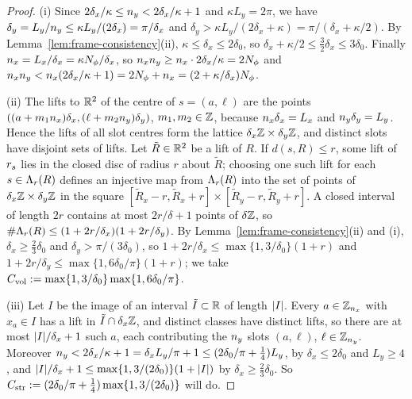\begin{proof}
(i) Since $2\delta_x/\kappa\le n_y<2\delta_x/\kappa+1$ and $\kappa L_y=2\pi$, we have
$\delta_y=L_y/n_y\le\kappa L_y/(2\delta_x)=\pi/\delta_x$ and $\delta_y>\kappa L_y/(2\delta_x+\kappa)=\pi/(\delta_x+\kappa/2)$.
By Lemma~\ref{lem:frame-consistency}(ii), $\kappa\le\delta_x\le2\delta_0$, so $\delta_x+\kappa/2\le\frac32\delta_x\le3\delta_0$.
Finally $n_x=L_x/\delta_x=\kappa N_{\phi}/\delta_x$, so $n_xn_y\ge n_x\cdot2\delta_x/\kappa=2N_{\phi}$ and
$n_xn_y<n_x(2\delta_x/\kappa+1)=2N_{\phi}+n_x=(2+\kappa/\delta_x)N_{\phi}$.

(ii) The lifts to $\mathbb{R}^2$ of the centre of $s=(a,\ell)$ are the points $((a+m_1n_x)\delta_x,(\ell+m_2n_y)\delta_y)$,
$m_1,m_2\in\mathbb{Z}$, because $n_x\delta_x=L_x$ and $n_y\delta_y=L_y$. Hence the lifts of all slot centres form the
lattice $\delta_x\mathbb{Z}\times\delta_y\mathbb{Z}$, and distinct slots have disjoint sets of lifts. Let $\tilde R\in\mathbb{R}^2$ be a lift
of $R$. If $d(s,R)\le r$, some lift of $r_{s}$ lies in the closed disc of radius $r$ about $\tilde R$; choosing one
such lift for each $s\in\Lambda_{r}(R)$ defines an injective map from $\Lambda_{r}(R)$ into the set of points of
$\delta_x\mathbb{Z}\times\delta_y\mathbb{Z}$ in the square $[\tilde R_x-r,\tilde R_x+r]\times[\tilde R_y-r,\tilde R_y+r]$. A closed
interval of length $2r$ contains at most $2r/\delta+1$ points of $\delta\mathbb{Z}$, so
$\#\Lambda_{r}(R)\le(1+2r/\delta_x)(1+2r/\delta_y)$. By Lemma~\ref{lem:frame-consistency}(ii) and (i),
$\delta_x\ge\frac23\delta_0$ and $\delta_y>\pi/(3\delta_0)$, so $1+2r/\delta_x\le\max\{1,3/\delta_0\}(1+r)$ and
$1+2r/\delta_y\le\max\{1,6\delta_0/\pi\}(1+r)$; we take $C_{\mathrm{vol}}:=\max\{1,3/\delta_0\}\max\{1,6\delta_0/\pi\}$.

(iii) Let $I$ be the image of an interval $\tilde I\subset\mathbb{R}$ of length $\lvert I\rvert$. Every $a\in\mathbb{Z}_{n_x}$ with $x_a\in I$
has a lift in $\tilde I\cap\delta_x\mathbb{Z}$, and distinct classes have distinct lifts, so there are at most
$\lvert I\rvert/\delta_x+1$ such $a$, each contributing the $n_y$ slots $(a,\ell)$, $\ell\in\mathbb{Z}_{n_y}$. Moreover
$n_y<2\delta_x/\kappa+1=\delta_xL_y/\pi+1\le(2\delta_0/\pi+\frac14)L_y$, by $\delta_x\le2\delta_0$ and $L_y\ge4$, and
$\lvert I\rvert/\delta_x+1\le\max\{1,3/(2\delta_0)\}(1+\lvert I\rvert)$ by $\delta_x\ge\frac23\delta_0$. So
$C_{\rm str}:=(2\delta_0/\pi+\frac14)\max\{1,3/(2\delta_0)\}$ will do.
\end{proof}

